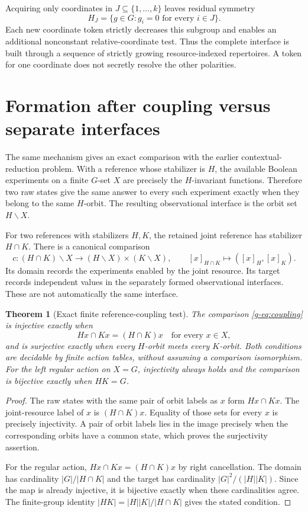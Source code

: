 \documentclass[11pt]{article}
\newtheorem{theorem}{Theorem}[section]
\theoremstyle{definition}
\theoremstyle{remark}
\begin{document}
Acquiring only coordinates in $J\subseteq\{1,\ldots,k\}$ leaves residual symmetry
\[
 H_J=\{g\in G:g_i=0\text{ for every }i\in J\}.
\]
Each new coordinate token strictly decreases this subgroup and enables an additional nonconstant relative-coordinate test. Thus the complete interface is built through a sequence of strictly growing resource-indexed repertoires. A token for one coordinate does not secretly resolve the other polarities.

\section{Formation after coupling versus separate interfaces}\label{g-sec:coupling}
The same mechanism gives an exact comparison with the earlier contextual-reduction problem. With a reference whose stabilizer is $H$, the available Boolean experiments on a finite $G$-set $X$ are precisely the $H$-invariant functions. Therefore two raw states give the same answer to every such experiment exactly when they belong to the same $H$-orbit. The resulting observational interface is the orbit set $H\backslash X$.

For two references with stabilizers $H,K$, the retained joint reference has stabilizer $H\cap K$. There is a canonical comparison
\begin{equation}\label{g-eq:coupling}
 c:(H\cap K)\backslash X\longrightarrow
 (H\backslash X)\times(K\backslash X),
 \qquad [x]_{H\cap K}\longmapsto([x]_H,[x]_K).
\end{equation}
Its domain records the experiments enabled by the joint resource. Its target records independent values in the separately formed observational interfaces. These are not automatically the same interface.

\begin{theorem}[Exact finite reference-coupling test]\label{g-thm:coupling}
The comparison \eqref{g-eq:coupling} is injective exactly when
\[
 Hx\cap Kx=(H\cap K)x\quad\text{for every }x\in X,
\]
and is surjective exactly when every $H$-orbit meets every $K$-orbit. Both conditions are decidable by finite action tables, without assuming a comparison isomorphism. For the left regular action on $X=G$, injectivity always holds and the comparison is bijective exactly when $HK=G$.
\end{theorem}
\begin{proof}
The raw states with the same pair of orbit labels as $x$ form $Hx\cap Kx$. The joint-resource label of $x$ is $(H\cap K)x$. Equality of those sets for every $x$ is precisely injectivity. A pair of orbit labels lies in the image precisely when the corresponding orbits have a common state, which proves the surjectivity assertion.

For the regular action, $Hx\cap Kx=(H\cap K)x$ by right cancellation. The domain has cardinality $|G|/|H\cap K|$ and the target has cardinality $|G|^2/(|H||K|)$. Since the map is already injective, it is bijective exactly when these cardinalities agree. The finite-group identity $|HK|=|H||K|/|H\cap K|$ gives the stated condition.\end{proof}
\end{document}
